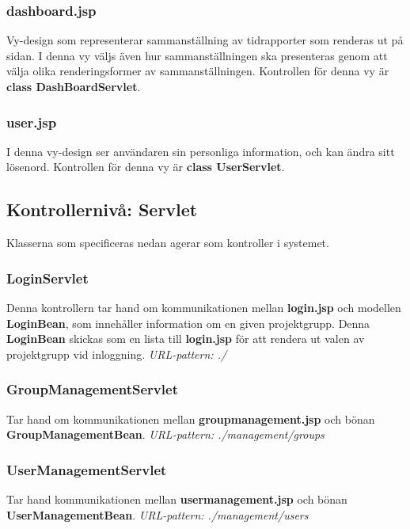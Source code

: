 \documentclass[paper=a4, fontsize=11pt,twoside]{article}
\begin{document}
\subsubsection{dashboard.jsp}	
Vy-design som representerar sammanställning av tidrapporter som renderas ut på sidan. I denna vy väljs även hur sammanställningen ska presenteras genom att välja olika renderingsformer av sammanställningen. Kontrollen för denna vy är \textbf{class DashBoardServlet}.

\subsubsection{user.jsp}	
I denna vy-design ser användaren sin personliga information, och kan ändra sitt lösenord. Kontrollen för denna vy är \textbf{ class UserServlet}.



\subsection{Kontrollernivå: Servlet}
Klasserna som specificeras nedan agerar som kontroller i systemet.

\subsubsection{LoginServlet}
Denna kontrollern tar hand om kommunikationen mellan \textbf{login.jsp} och modellen \textbf{LoginBean}, som innehåller information om en given projektgrupp. Denna \textbf{LoginBean} skickas som en lista till \textbf{login.jsp} för att rendera ut valen av projektgrupp vid inloggning.\newline
\newline
\textit{URL-pattern: ./}

\subsubsection{GroupManagementServlet}
Tar hand om kommunikationen mellan \textbf{groupmanagement.jsp} och bönan \textbf{GroupManagementBean}.\newline
\newline
\textit{URL-pattern: ./management/groups}

\subsubsection{UserManagementServlet}
Tar hand kommunikationen mellan \textbf{usermanagement.jsp} och bönan \textbf{UserManagementBean}.\newline
\newline
\textit{URL-pattern: ./management/users}
\end{document}
